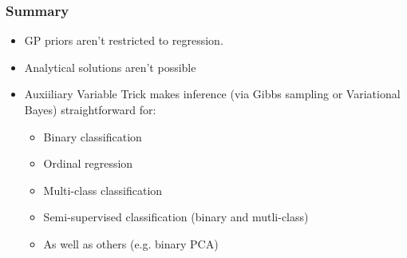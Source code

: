 \begin{frame}
	\frametitle{Summary}
	\begin{itemize}
		\item \ac{GP} priors aren't restricted to regression.
		\item Analytical solutions aren't possible
		\item Auxiiliary Variable Trick makes inference (via Gibbs sampling or Variational Bayes) straightforward for:
		\begin{itemize}
			\item Binary classification
			\item Ordinal regression
			\item Multi-class classification
			\item Semi-supervised classification (binary and mutli-class)
			\item As well as others (e.g. binary PCA)
		\end{itemize}
	\end{itemize}
\end{frame}
